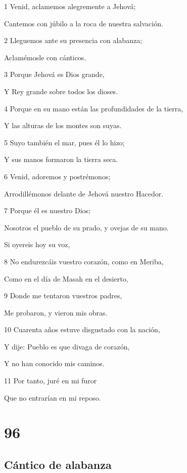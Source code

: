 \par 1 Venid, aclamemos alegremente a Jehová;
\par Cantemos con júbilo a la roca de nuestra salvación.
\par 2 Lleguemos ante su presencia con alabanza;
\par Aclamémosle con cánticos.
\par 3 Porque Jehová es Dios grande,
\par Y Rey grande sobre todos los dioses.
\par 4 Porque en su mano están las profundidades de la tierra,
\par Y las alturas de los montes son suyas.
\par 5 Suyo también el mar, pues él lo hizo;
\par Y sus manos formaron la tierra seca.
\par 6 Venid, adoremos y postrémonos;
\par Arrodillémonos delante de Jehová nuestro Hacedor.
\par 7 Porque él es nuestro Dios;
\par Nosotros el pueblo de su prado, y ovejas de su mano.
\par Si oyereis hoy su voz,
\par 8 No endurezcáis vuestro corazón, como en Meriba,
\par Como en el día de Masah en el desierto,
\par 9 Donde me tentaron vuestros padres,
\par Me probaron,  y vieron mis obras.
\par 10 Cuarenta años estuve disgustado con la nación,
\par Y dije: Pueblo es que divaga de corazón,
\par Y no han conocido mis caminos.
\par 11 Por tanto, juré en mi furor
\par Que no entrarían en mi reposo.

\chapter{96}

\section*{Cántico de alabanza}

